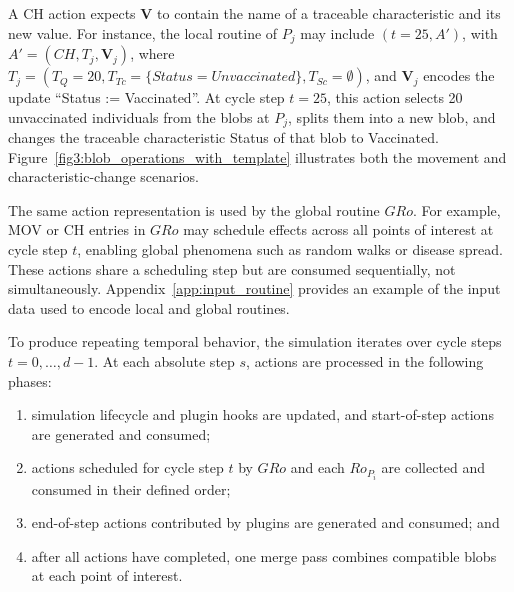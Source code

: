 A CH action expects $\bm{V}$ to contain the name of a traceable characteristic and its new value. For instance, the local routine of $P_j$ may include $(t = 25, A')$, with $A' = (CH, T_j, \bm{V}_j)$, where $T_j=(T_Q=20, T_{Tc}=\{Status=Unvaccinated\}, T_{Sc}=\emptyset)$, and $\bm{V}_j$ encodes the update ``Status := Vaccinated''. At cycle step $t=25$, this action selects 20 unvaccinated individuals from the blobs at $P_j$, splits them into a new blob, and changes the traceable characteristic Status of that blob to Vaccinated. Figure~\ref{fig3:blob_operations_with_template} illustrates both the movement and characteristic-change scenarios.



\begingroup\color{red}
The same action representation is used by the global routine $GRo$. For example, MOV or CH entries in $GRo$ may schedule effects across all points of interest at cycle step $t$, enabling global phenomena such as random walks or disease spread. These actions share a scheduling step but are consumed sequentially, not simultaneously. Appendix~\ref{app:input_routine} provides an example of the input data used to encode local and global routines.
\endgroup


\begingroup\color{red}
To produce repeating temporal behavior, the simulation iterates over cycle steps $t=0,\ldots,d-1$. At each absolute step $s$, actions are processed in the following phases:
\begin{enumerate}
    \item simulation lifecycle and plugin hooks are updated, and start-of-step actions are generated and consumed;
    \item actions scheduled for cycle step $t$ by $GRo$ and each $Ro_{P_i}$ are collected and consumed in their defined order;
    \item end-of-step actions contributed by plugins are generated and consumed; and
    \item after all actions have completed, one merge pass combines compatible blobs at each point of interest.
\end{enumerate}

